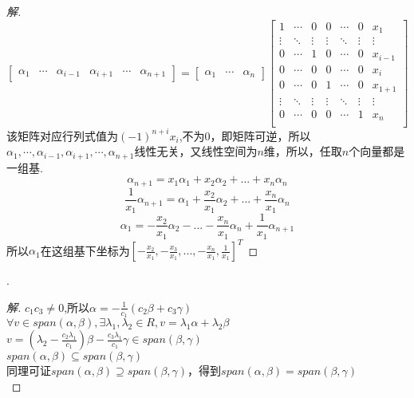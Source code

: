 \documentclass[10pt,a4paper]{report}
\begin{document}
\begin{proof}[解]
	$$
	\left[
	\begin{matrix}
	\alpha_{1} & \cdots & \alpha_{i-1} & \alpha_{i+1} & \cdots & \alpha_{n+1}
	\end{matrix}
	\right] = \left[
	\begin{matrix}
	\alpha_{1} & \cdots & \alpha_{n}
	\end{matrix}
	\right]\left[
	\begin{matrix}
	1 & \cdots & 0 & 0 & \cdots & 0 & x_{1}\\
	\vdots & \ddots & \vdots & \vdots & \ddots & \vdots & \vdots\\
	0 & \cdots & 1 & 0 & \cdots & 0 & x_{i-1}\\
	0 & \cdots & 0 & 0 & \cdots & 0 & x_{i}\\
	0 & \cdots & 0 & 1 & \cdots & 0 & x_{1+1}\\
	\vdots & \ddots & \vdots & \vdots & \ddots & \vdots & \vdots\\
	0 & \cdots & 0 & 0 & \cdots & 1 & x_{n}\\
	\end{matrix}
	\right]
	$$
	该矩阵对应行列式值为$(-1)^{n+i}x_{i}$,不为0，即矩阵可逆，所以$\alpha_{1} , \cdots , \alpha_{i-1} , \alpha_{i+1} , \cdots , \alpha_{n+1}$线性无关，又线性空间为$n$维，所以，任取$n$个向量都是一组基.\\
	$$\alpha_{n+1} = x_{1}\alpha_{1}+x_{2}\alpha_{2}+...+x_{n}\alpha_{n}$$
	$$\frac{1}{x_{1}}\alpha_{n+1} = \alpha_{1}+\frac{x_{2}}{x_{1}}\alpha_{2}+...+\frac{x_{n}}{x_{1}}\alpha_{n}$$
	$$\alpha_{1} = -\frac{x_{2}}{x_{1}}\alpha_{2}-...-\frac{x_{n}}{x_{1}}\alpha_{n} + \frac{1}{x_{1}}\alpha_{n+1}$$
	所以$\alpha_{1}$在这组基下坐标为$[-\frac{x_{2}}{x_{1}}, -\frac{x_{3}}{x_{1}},..., -\frac{x_{n}}{x_{1}},\frac{1}{x_{1}}]^{T}$
\end{proof}
.
\begin{proof}[解]
	$c_{1}c_{3} \neq 0$,所以$\alpha = -\frac{1}{c_{1}}(c_{2}\beta+c_{3}\gamma)$\\
	$\forall v \in span(\alpha,\beta), \exists \lambda_{1}, \lambda_{2} \in R, v=\lambda_{1}\alpha+\lambda_{2}\beta $\\
	$v = (\lambda_{2} - \frac{c_{2}\lambda_{1}}{c_{1}})\beta-\frac{c_{3}\lambda_{1}}{c_{1}}\gamma \in span(\beta, \gamma)$\\
	$span(\alpha, \beta) \subseteq span(\beta,\gamma)$\\
	同理可证$span(\alpha, \beta) \supseteq span(\beta,\gamma)$，得到$span(\alpha, \beta) = span(\beta,\gamma)$\\
\end{proof}
\end{document}
